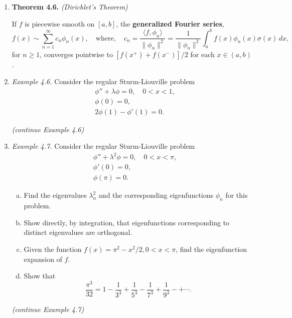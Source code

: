 \begin{enumerate}
\item \textbf{Theorem 4.6.} \textit{(Dirichlet's Theorem)}

If $f$ is piecewise smooth on $[a, b]$, the \textbf{generalized Fourier series},
\[
f(x)\sim \sum_{n=1}^{\infty} c_{n}\phi_{n}(x), \quad 
\text{where}, \quad
c_{n}=\frac{\langle f, \phi_{n}\rangle}{\|\phi_{n}\|^{2}} = \frac{1}{\|\phi_{n}\|^{2}}\int_{a}^{b} f(x)\phi_{n}(x)\sigma(x)\,dx,
\]
for $n \geq 1$, converges pointwise to $[f (x ^{+} ) + f (x ^{-} )]/2$ for each $x \in (a, b)$.



\newpage

\item \textit{Example 4.6.} Consider the regular Sturm-Liouville problem
\begin{align*}
& \phi '' +  \lambda \phi = 0, \quad 0 < x < 1,\\
& \phi(0) = 0, \\
& 2 \phi(1) - \phi ' (1) = 0.
\end{align*}


\newpage
\textit{(continue Example 4.6)}



\newpage



\item \textit{Example 4.7.} Consider the regular Sturm-Liouville problem
\begin{align*}
& \phi '' +  \lambda^{2} \phi = 0, \quad 0 < x < \pi,\\
& \phi'(0) = 0, \\
& \phi(\pi) = 0.
\end{align*}

\begin{enumerate}[(a)]
    \item Find the eigenvalues $\lambda^{2}_{n}$ and the corresponding eigenfunctions $\phi_{n}$ for this problem.
    \item Show directly, by integration, that eigenfunctions corresponding to distinct eigenvalues are orthogonal.
    \item Given the function $f (x) = \pi^{2} - x^{2} /2, 0 < x < \pi$, find the eigenfunction expansion of $f$.
    \item Show that
    \[\frac{\pi^{3}}{32}=1 - \frac{1}{3^{3}} + \frac{1}{5^{3}} - \frac{1}{7^{3}}+ \frac{1}{9^{3}} - + \cdots. \]
\end{enumerate}



\newpage
\textit{(continue Example 4.7)}


\end{enumerate}
